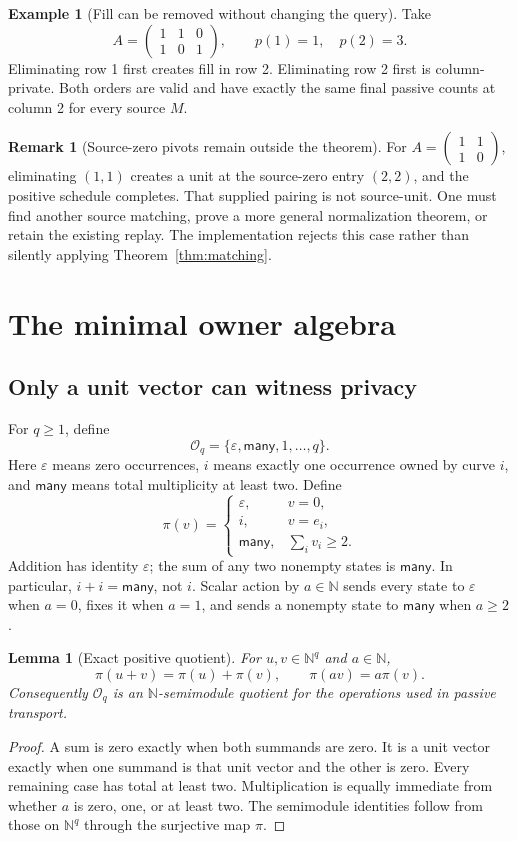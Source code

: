 \documentclass[11pt,letterpaper]{article}
\newtheorem{lemma}[theorem]{Lemma}
\theoremstyle{definition}
\newtheorem{example}[theorem]{Example}
\newtheorem{remark}[theorem]{Remark}
\newcommand{\N}{\mathbb N}
\newcommand{\eps}{\varepsilon}
\newcommand{\clash}{\mathsf{many}}
\begin{document}
\begin{example}[Fill can be removed without changing the query]
Take
\[
 A=\begin{pmatrix}1&1&0\\1&0&1\end{pmatrix},\qquad p(1)=1,\quad p(2)=3.
\]
Eliminating row 1 first creates fill in row 2. Eliminating row 2 first is column-private. Both orders are valid and have exactly the same final passive counts at column 2 for every source $M$.
\end{example}

\begin{remark}[Source-zero pivots remain outside the theorem]
For $A=\left(\begin{smallmatrix}1&1\\1&0\end{smallmatrix}\right)$, eliminating $(1,1)$ creates a unit at the source-zero entry $(2,2)$, and the positive schedule completes. That supplied pairing is not source-unit. One must find another source matching, prove a more general normalization theorem, or retain the existing replay. The implementation rejects this case rather than silently applying Theorem~\ref{thm:matching}.
\end{remark}

\section{The minimal owner algebra}
\subsection{Only a unit vector can witness privacy}
For $q\ge1$, define
\[
 \mathcal O_q=\{\eps,\clash,1,\ldots,q\}.
\]
Here $\eps$ means zero occurrences, $i$ means exactly one occurrence owned by curve $i$, and $\clash$ means total multiplicity at least two. Define
\[
 \pi(v)=\begin{cases}
 \eps,&v=0,\\
 i,&v=e_i,\\
 \clash,&\sum_i v_i\ge2.
 \end{cases}
\]
Addition has identity $\eps$; the sum of any two nonempty states is $\clash$. In particular, $i+i=\clash$, not $i$. Scalar action by $a\in\N$ sends every state to $\eps$ when $a=0$, fixes it when $a=1$, and sends a nonempty state to $\clash$ when $a\ge2$.

\begin{lemma}[Exact positive quotient]\label{lem:quotient}
For $u,v\in\N^q$ and $a\in\N$,
\[
 \pi(u+v)=\pi(u)+\pi(v),\qquad \pi(av)=a\pi(v).
\]
Consequently $\mathcal O_q$ is an $\N$-semimodule quotient for the operations used in passive transport.
\end{lemma}
\begin{proof}
A sum is zero exactly when both summands are zero. It is a unit vector exactly when one summand is that unit vector and the other is zero. Every remaining case has total at least two. Multiplication is equally immediate from whether $a$ is zero, one, or at least two. The semimodule identities follow from those on $\N^q$ through the surjective map $\pi$.
\end{proof}
\end{document}
